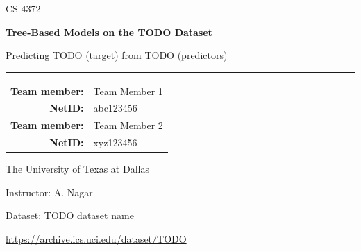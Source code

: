 \documentclass[11pt]{article}
\newcommand{\coursecode}{CS 4372}
\newcommand{\instructor}{A. Nagar}
\newcommand{\projecttitle}{Tree-Based Models on the TODO Dataset}
\newcommand{\projectsubtitle}{Predicting TODO (target) from TODO (predictors)}
\newcommand{\memberA}{Team Member 1}
\newcommand{\netidA}{abc123456}
\newcommand{\memberB}{Team Member 2}      %
\newcommand{\netidB}{xyz123456}           %
\newcommand{\datasetname}{TODO dataset name}
\newcommand{\dataseturl}{https://archive.ics.uci.edu/dataset/TODO}
\DeclareRobustCommand{\todo}[1]{{\color{red}\textit{[TODO: #1]}}}
\begin{document}
\begin{titlepage}
  \thispagestyle{empty}
  \centering
  \vspace*{1.15in}

  {\Large\textcolor{accent}{\coursecode}\par}
  \vspace{0.35in}
  {\Huge\bfseries \projecttitle\par}
  \vspace{0.25in}
  {\Large \projectsubtitle\par}

  \vspace{0.55in}
  \rule{0.78\textwidth}{0.6pt}
  \vspace{0.5in}

  {\large
  \begin{tabular}{>{\bfseries}rl}
    Team member: & \memberA \\
    NetID: & \netidA \\
    \addlinespace[0.3em]
    Team member: & \memberB \\
    NetID: & \netidB \\
  \end{tabular}
  \par}

  \vfill
  {\large The University of Texas at Dallas\par}
  \vspace{0.12in}
  {\large Instructor: \instructor\par}
  \vspace{0.4in}
  {\small Dataset: \datasetname\par}
  {\small\url{\dataseturl}\par}
\end{titlepage}


\begin{abstract}
\todo{Write this last, in 150--200 words. Cover: the prediction task and dataset; the
data-quality actions taken; the four tuned models (decision tree, random forest, AdaBoost,
XGBoost); the best model and its headline test metrics; what the diagnostics (confusion
matrix, ROC, precision--recall) revealed; and the main limitation.}
\end{abstract}

\end{document}
